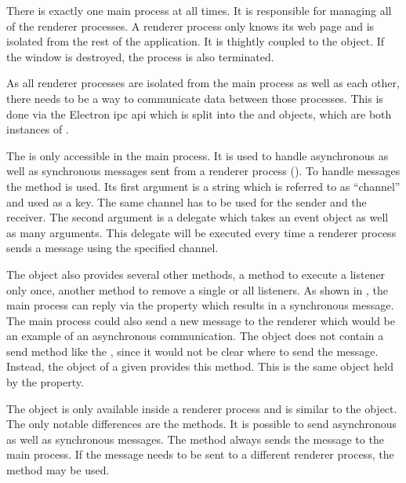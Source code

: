There is exactly one main process at all times. It is responsible for managing all of the renderer processes. A renderer process only knows its web page and is isolated from the rest of the application. It is thightly coupled to the  object. If the window is destroyed, the process is also terminated.


As all renderer processes are isolated from the main process as well as each other, there needs to be a way to communicate data between those processes. This is done via the Electron \gls{ipc} \gls{api} which is split into the  and  objects, which are both instances of .


The  is only accessible in the main process. It is used to handle asynchronous as well as synchronous messages sent from a renderer process (). To handle messages the  method is used. Its first argument is a string which is referred to as \enquote{channel} and used as a key. The same channel has to be used for the sender and the receiver. The second argument is a delegate which takes an event object as well as many arguments. This delegate will be executed every time a renderer process sends a message using the specified channel.

The  object also provides several other methods, \zB a method to execute a listener only once, another method to remove a single or all listeners. As shown in , the main process can reply via the  property which results in a synchronous message. The main process could also send a new message to the renderer which would be an example of an asynchronous communication. The  object does not contain a send method like the , since it would not be clear where to send the message. Instead, the  object of a given  provides this method. This is the same object held by the  property. \cite{ipcMain}

The  object is only available inside a renderer process and is similar to the  object. The only notable differences are the  methods. It is possible to send asynchronous as well as synchronous messages. The  method always sends the message to the main process. If the message needs to be sent to a different renderer process, the  method may be used. \cite{ipcRenderer}

